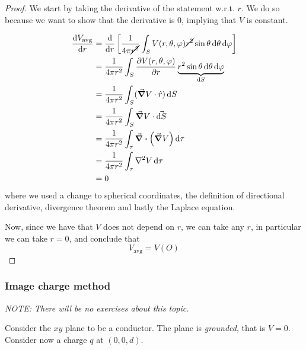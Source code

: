 \documentclass[12pt]{extarticle}
\begin{document}
\begin{proof}
	We start by taking the derivative of the statement w.r.t. $r$.
	We do so because we want to show that the derivative is $0$, implying that $V$ is constant.

	\begin{align}
		\dv{V_\text{avg}}{r} & = \dv{}{r} \left[ \oneover{4 \pi \cancel{r^2}} \int_S V(r, \theta, \varphi) \cancel{r^2} \sin \theta \dd{\theta} \dd{\varphi} \right] \\
		                     & = \oneover{4 \pi r^2} \int_S \pdv{V(r, \theta, \varphi)}{r} \underbrace{r^2 \sin \theta \dd{\theta} \dd{\varphi}}_{\dd{S}}            \\
		                     & = \oneover{4 \pi r^2} \int_S (\grad V \cdot \hat r) \dd{S}                                                                            \\
		                     & = \oneover{4 \pi r^2} \int_S \grad V \cdot \vec{\dd{S}}                                                                               \\
		                     & = \oneover{4 \pi r^2} \int_\tau \div (\grad V) \dd{\tau}                                                                              \\
		                     & = \oneover{4 \pi r^2} \int_\tau \laplacian V \dd{\tau}                                                                                \\
		                     & = 0
	\end{align}
	where we used a change to spherical coordinates, the definition of directional derivative, divergence theorem and lastly the Laplace equation.

	Now, since we have that $V$ does not depend on $r$, we can take any $r$, in particular we can take $r = 0$, and conclude that
	\begin{equation}
		V_\text{avg} = V(O)
	\end{equation}
\end{proof}

\subsubsection{Image charge method}

\emph{NOTE: There will be no exercises about this topic.}

Consider the $xy$ plane to be a conductor.
The plane is \emph{grounded}, that is $V = 0$.
Consider now a charge $q$ at $(0, 0, d)$.
\end{document}
